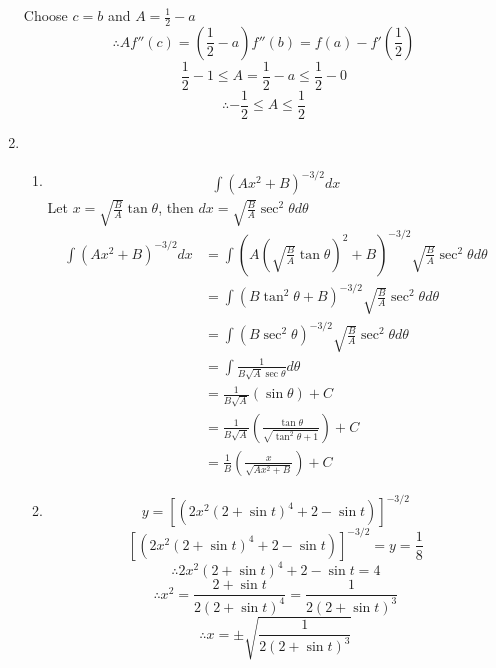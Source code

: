 \documentclass[12pt]{article}
\theoremstyle{definition}
\begin{document}
\begin{enumerate}
        Choose $c=b$ and $A=\frac{1}{2}-a$
        \begin{equation*}
          \therefore Af''(c) = \left(\frac{1}{2}-a\right)f''(b) = f(a) - f'\left(\frac{1}{2}\right)
        \end{equation*}
        \[\frac{1}{2}-1 \leq A = \frac{1}{2}-a \leq \frac{1}{2}-0\]
        \[\therefore -\frac{1}{2} \leq A \leq \frac{1}{2}\]
  \item
        \begin{enumerate}
          \item
                \begin{align*}
                  \int (Ax^2 + B)^{-3/2} dx
                \end{align*}
                Let $x = \sqrt{\frac{B}{A}}\tan \theta$, then $dx = \sqrt{\frac{B}{A}}\sec^2 \theta d\theta$
                \begin{align*}
                  \int (Ax^2 + B)^{-3/2} dx & = \int \left(A\left(\sqrt{\frac{B}{A}}\tan \theta\right)^2 + B\right)^{-3/2} \sqrt{\frac{B}{A}}\sec^2 \theta d\theta \\
                                            & = \int (B \tan^2 \theta + B)^{-3/2} \sqrt{\frac{B}{A}}\sec^2 \theta d\theta                                          \\
                                            & = \int (B \sec^2 \theta)^{-3/2} \sqrt{\frac{B}{A}}\sec^2 \theta d\theta                                              \\
                                            & = \int \frac{1}{B\sqrt{A}\sec \theta} d\theta                                                                        \\
                                            & = \frac{1}{B\sqrt{A}} (\sin \theta) + C                                                                              \\
                                            & = \frac{1}{B\sqrt{A}} \left(\frac{\tan \theta}{\sqrt{\tan^2\theta+1}}\right) + C                                     \\
                                            & = \frac{1}{B} \left(\frac{x}{\sqrt{Ax^2+B}}\right) + C
                \end{align*}
          \item
                \begin{equation*}
                  y = [(2x^2(2+\sin t)^4+2-\sin t)]^{-3/2}
                \end{equation*}
                \[[(2x^2(2+\sin t)^4+2-\sin t)]^{-3/2} = y = \frac{1}{8}\]
                \[\therefore 2x^2(2+\sin t)^4+2-\sin t = 4 \]
                \[\therefore x^2 = \frac{2+\sin t}{2(2+\sin t)^4} =  \frac{1}{2(2+\sin t)^3}\]
                \[\therefore x = \pm \sqrt{\frac{1}{2(2+\sin t)^3}}\]


\end{enumerate}
\end{enumerate}
\end{document}

